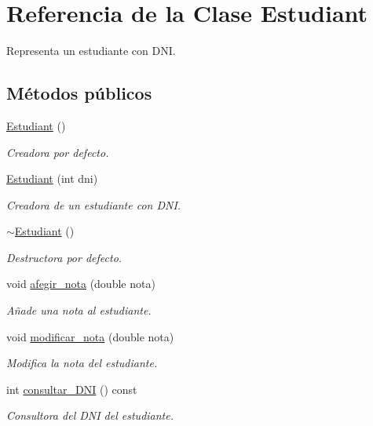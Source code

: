 \hypertarget{class_estudiant}{}\section{Referencia de la Clase Estudiant}
\label{class_estudiant}


Representa un estudiante con D\+NI.  


\subsection*{Métodos públicos}
\begin{DoxyCompactItemize}
\item 
\hyperlink{class_estudiant_a88f7f46dd946fef9f7a71fdc608afd16}{Estudiant} ()
\begin{DoxyCompactList}\small\item\em Creadora por defecto. \end{DoxyCompactList}\item 
\hyperlink{class_estudiant_ae0a9ebffe2ff8fb6cecc15a909206a1b}{Estudiant} (int dni)
\begin{DoxyCompactList}\small\item\em Creadora de un estudiante con D\+NI. \end{DoxyCompactList}\item 
\hyperlink{class_estudiant_a2e2bd22924dacfe16acf12b5c31efd01}{$\sim$\+Estudiant} ()
\begin{DoxyCompactList}\small\item\em Destructora por defecto. \end{DoxyCompactList}\item 
void \hyperlink{class_estudiant_a8a2186560dce4ccfc5922d2c98f21305}{afegir\+\_\+nota} (double nota)
\begin{DoxyCompactList}\small\item\em Añade una nota al estudiante. \end{DoxyCompactList}\item 
void \hyperlink{class_estudiant_a5d5eded678c16a864f22477d401a56af}{modificar\+\_\+nota} (double nota)
\begin{DoxyCompactList}\small\item\em Modifica la nota del estudiante. \end{DoxyCompactList}\item 
int \hyperlink{class_estudiant_ad37108e53c6c0f1fcb5786e77e1902f5}{consultar\+\_\+\+D\+NI} () const
\begin{DoxyCompactList}\small\item\em Consultora del D\+NI del estudiante. \end{DoxyCompactList}\item 

\end{DoxyCompactItemize}
